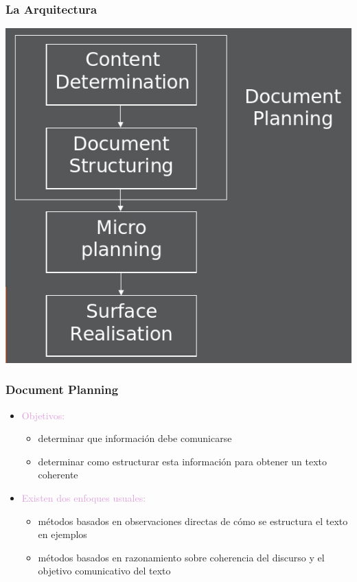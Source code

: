 \documentclass[compress,color=usenames]{beamer}
\newcommand{\mH}[1]{\textcolor{Plum}{#1}}
\begin{document}
\begin{frame}
\frametitle{La Arquitectura}

\begin{center}
\includegraphics[scale=.4]{pics/pic7.jpg}
\end{center}
 
\end{frame}

\begin{frame}
\frametitle{Document Planning}

\begin{itemize}
\item { \mH{Objetivos: }}
\begin{itemize}
\item determinar que informaci\'on debe comunicarse
\item determinar como estructurar esta informaci\'on para obtener un texto 
coherente
\end{itemize}
\item { \mH{Existen dos enfoques usuales:}}
\begin{itemize}
\item m\'etodos basados en observaciones directas de c\'omo se estructura el texto en ejemplos
\item m\'etodos basados en razonamiento sobre coherencia del discurso y el objetivo comunicativo del texto
\end{itemize}
\end{itemize}
 
\end{frame}
\end{document}
